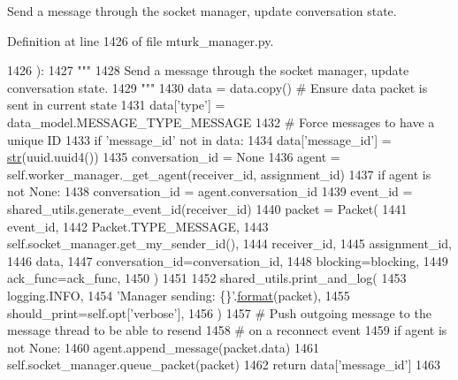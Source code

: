 \begin{DoxyVerb}Send a message through the socket manager, update conversation state.
\end{DoxyVerb}
 

Definition at line 1426 of file mturk\+\_\+manager.\+py.


\begin{DoxyCode}
1426     ):
1427         \textcolor{stringliteral}{"""}
1428 \textcolor{stringliteral}{        Send a message through the socket manager, update conversation state.}
1429 \textcolor{stringliteral}{        """}
1430         data = data.copy()  \textcolor{comment}{# Ensure data packet is sent in current state}
1431         data[\textcolor{stringliteral}{'type'}] = data\_model.MESSAGE\_TYPE\_MESSAGE
1432         \textcolor{comment}{# Force messages to have a unique ID}
1433         \textcolor{keywordflow}{if} \textcolor{stringliteral}{'message\_id'} \textcolor{keywordflow}{not} \textcolor{keywordflow}{in} data:
1434             data[\textcolor{stringliteral}{'message\_id'}] = \hyperlink{namespacegenerate__task__READMEs_a5b88452ffb87b78c8c85ececebafc09f}{str}(uuid.uuid4())
1435         conversation\_id = \textcolor{keywordtype}{None}
1436         agent = self.worker\_manager.\_get\_agent(receiver\_id, assignment\_id)
1437         \textcolor{keywordflow}{if} agent \textcolor{keywordflow}{is} \textcolor{keywordflow}{not} \textcolor{keywordtype}{None}:
1438             conversation\_id = agent.conversation\_id
1439         event\_id = shared\_utils.generate\_event\_id(receiver\_id)
1440         packet = Packet(
1441             event\_id,
1442             Packet.TYPE\_MESSAGE,
1443             self.socket\_manager.get\_my\_sender\_id(),
1444             receiver\_id,
1445             assignment\_id,
1446             data,
1447             conversation\_id=conversation\_id,
1448             blocking=blocking,
1449             ack\_func=ack\_func,
1450         )
1451 
1452         shared\_utils.print\_and\_log(
1453             logging.INFO,
1454             \textcolor{stringliteral}{'Manager sending: \{\}'}.\hyperlink{namespaceparlai_1_1chat__service_1_1services_1_1messenger_1_1shared__utils_a32e2e2022b824fbaf80c747160b52a76}{format}(packet),
1455             should\_print=self.opt[\textcolor{stringliteral}{'verbose'}],
1456         )
1457         \textcolor{comment}{# Push outgoing message to the message thread to be able to resend}
1458         \textcolor{comment}{# on a reconnect event}
1459         \textcolor{keywordflow}{if} agent \textcolor{keywordflow}{is} \textcolor{keywordflow}{not} \textcolor{keywordtype}{None}:
1460             agent.append\_message(packet.data)
1461         self.socket\_manager.queue\_packet(packet)
1462         \textcolor{keywordflow}{return} data[\textcolor{stringliteral}{'message\_id'}]
1463 
\end{DoxyCode}

